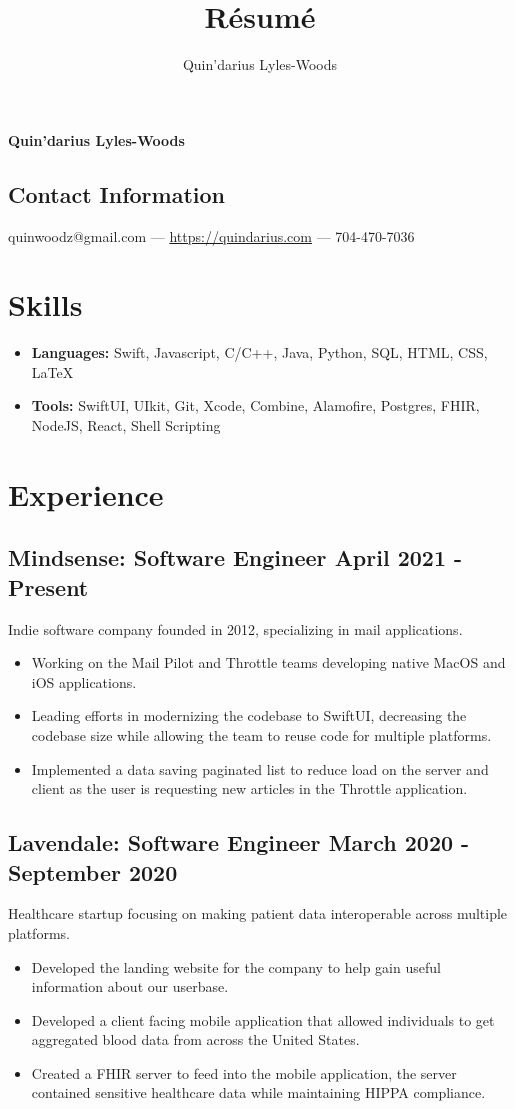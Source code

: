 \documentclass{article}
\makeatletter
\renewcommand{\maketitle}
{
\begin{center}
{\huge\bfseries
Quin'darius Lyles-Woods
}
\end{center}
\vspace{.25em}
\subsection{Contact Information}
quinwoodz@gmail.com --- \url{https://quindarius.com} --- 704-470-7036
}
\makeatother
\begin{document}
\title{R\'esum\'e}
\author{Quin'darius Lyles-Woods}
\maketitle
\thispagestyle{empty}
\section{Skills}
\begin{itemize}
	\item \textbf{Languages: } Swift, Javascript, C/C++, Java, Python, SQL, HTML, CSS, \LaTeX
	\item \textbf{Tools: } SwiftUI, UIkit, Git, Xcode, Combine, Alamofire, Postgres, FHIR, NodeJS, React, Shell Scripting
\end{itemize}
\section{Experience}
\subsection{\large{Mindsense}: Software Engineer \hfill \small{April 2021 - Present}}
Indie software company founded in 2012, specializing in mail applications.
\begin{itemize}
\setlength\itemsep{.1em}
	\item Working on the Mail Pilot and Throttle teams developing native MacOS and iOS applications.
	\item Leading efforts in modernizing the codebase to SwiftUI, decreasing the codebase size while allowing the team to reuse code for multiple platforms. 
	\item Implemented a data saving paginated list to reduce load on the server and client as the user is requesting new articles in the Throttle application. 
\end{itemize}
\subsection{\large{Lavendale}: Software Engineer \hfill \small{March 2020 - September 2020}}
Healthcare startup focusing on making patient data interoperable across multiple platforms.
\begin{itemize}
\setlength\itemsep{.1em}
	\item  Developed  the landing website for the company to help gain useful information about our userbase. 
	\item Developed a client facing mobile application that allowed individuals to get aggregated blood data from across the United States.
	\item Created a FHIR server to feed into the mobile application, the server contained sensitive healthcare data while maintaining HIPPA compliance.
\end{itemize}
\end{document}
